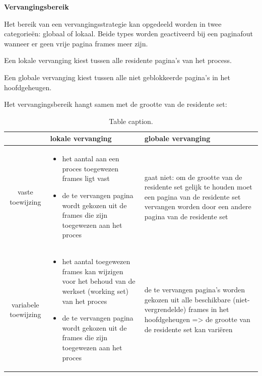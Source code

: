 \newpage
\begin{landscape}

\textbf{Vervangingsbereik}

Het bereik van een vervangingsstrategie kan opgedeeld worden in twee categorieën: globaal of lokaal. Beide types worden geactiveerd bij een paginafout wanneer er geen vrije pagina frames meer zijn.

Een lokale vervanging kiest tussen alle residente pagina’s van het process.

Een globale vervanging kiest tussen alle niet geblokkeerde pagina’s in het hoofdgeheugen.

Het vervangingsbereik hangt samen met de grootte van de residente set:

\begin{table}[ht]
\begin{center}
\begin{tabular}{|c|p{8cm}|p{8cm}|}
\cline{2-3}
\multicolumn{1}{c|}{} & lokale vervanging & globale vervanging \\
\hline
vaste toewijzing & \begin{itemize}
\item het aantal aan een proces toegewezen frames ligt vast

\item de te vervangen pagina wordt gekozen uit de frames die zijn toegewezen aan het proces
\end{itemize}
& gaat niet: om de grootte van de residente set gelijk te houden moet een pagina van de residente set vervangen worden door een andere pagina van de residente set \\
\hline
variabele toewijzing & \begin{itemize}
\item het aantal toegewezen frames kan wijzigen voor het behoud van de werkset (working set) van het proces

\item de te vervangen pagina wordt gekozen uit de frames die zijn toegewezen aan het proces
\end{itemize} &  de te vervangen pagina's worden gekozen uit alle beschikbare (niet- vergrendelde) frames in het hoofdgeheugen => de grootte van de residente set kan variëren \\
\hline
\end{tabular}
\end{center}
\caption{Table caption.}
\label{Table1}
\end{table}

\end{landscape}

